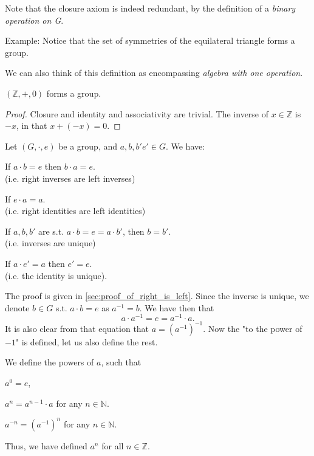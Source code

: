 \documentclass[12pt]{article}
\begin{document}
Note that the closure axiom is indeed redundant,
by the definition of a \emph{binary operation on G}.

Example: Notice that the set of symmetries of 
the equilateral triangle forms a group.

We can also think of this definition as
encompassing \emph{algebra with one operation}.

\begin{exercise}
    $(\mathbb{Z},+,0)$ forms a group.
\end{exercise}
\begin{proof}
    Closure and identity and associativity are trivial.
    The inverse of $x \in \mathbb{Z}$ is $-x$, in that $x + (-x) = 0$.
\end{proof}

\begin{theorem}
    \label{thm:right_is_left}
    Let $(G,\cdot,e)$ be a group, and $a,b,b'e' \in G$. We have:
    \begin{compactenum}[(i)]
    \item If $a \cdot b = e$ then $b \cdot a = e$. \\
        (i.e. right inverses are left inverses)
    \item If $e \cdot a = a$. \\
        (i.e. right identities are left identities)
    \item If $a,b,b'$ are s.t. $a \cdot b = e = a \cdot b'$,
        then $b = b'$. \\
        (i.e. inverses are unique)
    \item If $a \cdot e' = a$ then $e' = e$.\\
        (i.e. the identity is unique).
    \end{compactenum}
\end{theorem}

The proof is given in \autoref{sec:proof_of_right_is_left}.
Since the inverse is unique, we denote $b \in G$ s.t. $a \cdot b = e$ as $a^{-1} = b$.
We have then that
\[
    a \cdot a^{-1} = e = a^{-1} \cdot a.
\]
It is also clear from that equation that $a = (a^{-1})^{-1}$.
Now the "to the power of $-1$" is defined, let us also define the rest.
\begin{definition}
    We define the powers of $a$, such that
    \begin{compactitem}
    \item $a^{0} = e$,
    \item $a^{n} = a^{n-1} \cdot a$ for any $n \in \mathbb{N}$.
    \item $a^{-n} = (a^{-1})^{n}$ for any $n \in \mathbb{N}$.
    \end{compactitem}
\end{definition}
Thus, we have defined $a^{n}$ for all $n \in \mathbb{Z}$.
\end{document}
